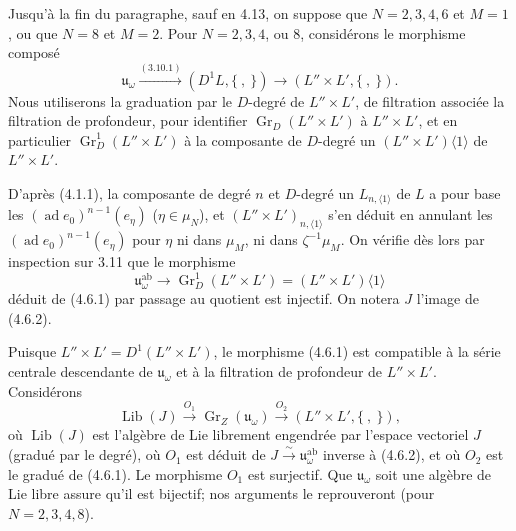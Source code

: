 \documentclass[10pt,a4paper]{article}
\newcommand{\Gr}{\operatorname{Gr}}
\newcommand{\ad}{\operatorname{ad}}
\newcommand{\uomega}{\mathfrak u_\omega}
\theoremstyle{deligne}
\newcommand{\heading}[1]{\vspace{0.65em}\noindent{\bfseries #1}\quad}
\begin{document}
\heading{4.6.} Jusqu'à la fin du paragraphe, sauf en 4.13, on suppose que \(N=2,3,4,6\) et \(M=1\), ou que \(N=8\) et \(M=2\). Pour \(N=2,3,4\), ou \(8\), considérons le morphisme composé
\[
\tag{4.6.1}
\uomega\overset{(3.10.1)}{\longrightarrow}(D^1L,\{\ ,\ \})\longrightarrow(L''\times L',\{\ ,\ \}).
\]
Nous utiliserons la graduation par le \(D\)-degré de \(L''\times L'\), de filtration associée la filtration de profondeur, pour identifier \(\Gr_D(L''\times L')\) à \(L''\times L'\), et en particulier \(\Gr_D^1(L''\times L')\) à la composante de \(D\)-degré un \((L''\times L')\langle1\rangle\) de \(L''\times L'\).

D'après (4.1.1), la composante de degré \(n\) et \(D\)-degré un \(L_{n,\langle1\rangle}\) de \(L\) a pour base les \((\ad e_0)^{n-1}(e_\eta)\) (\(\eta\in\mu_N\)), et \((L''\times L')_{n,\langle1\rangle}\) s'en déduit en annulant les \((\ad e_0)^{n-1}(e_\eta)\) pour \(\eta\) ni dans \(\mu_M\), ni dans \(\zeta^{-1}\mu_M\). On vérifie dès lors par inspection sur 3.11 que le morphisme
\[
\tag{4.6.2}
\uomega^{\mathrm{ab}}\longrightarrow \Gr_D^1(L''\times L')=(L''\times L')\langle1\rangle
\]
déduit de (4.6.1) par passage au quotient est injectif. On notera \(J\) l'image de (4.6.2).

Puisque \(L''\times L'=D^1(L''\times L')\), le morphisme (4.6.1) est compatible à la série centrale descendante de \(\uomega\) et à la filtration de profondeur de \(L''\times L'\). Considérons
\[
\tag{4.6.3}
\operatorname{Lib}(J)\overset{O_1}{\longrightarrow}\Gr_Z(\uomega)
\overset{O_2}{\longrightarrow}(L''\times L',\{\ ,\ \}),
\]
où \(\operatorname{Lib}(J)\) est l'algèbre de Lie librement engendrée par l'espace vectoriel \(J\) (gradué par le degré), où \(O_1\) est déduit de \(J\overset{\sim}{\to}\uomega^{\mathrm{ab}}\) inverse à (4.6.2), et où \(O_2\) est le gradué de (4.6.1). Le morphisme \(O_1\) est surjectif. Que \(\uomega\) soit une algèbre de Lie libre assure qu'il est bijectif; nos arguments le reprouveront (pour \(N=2,3,4,8\)).
\end{document}
